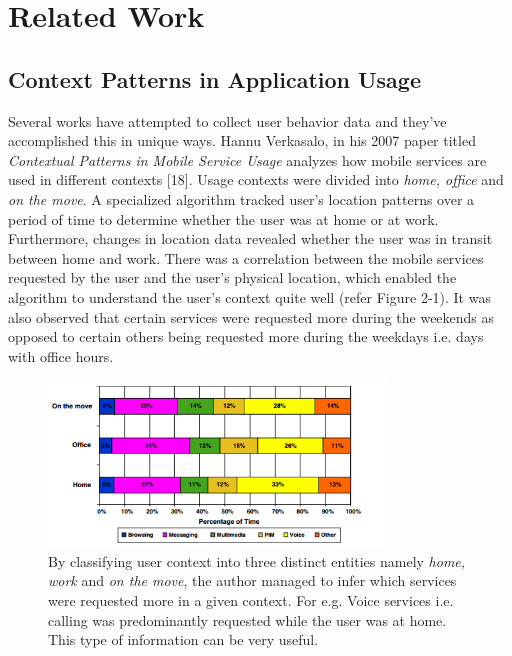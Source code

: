 \documentclass[12pt]{uthesis-v12}  %
\begin{document}

\chapter{Related Work}
	
	\section{Context Patterns in Application Usage}
		Several works have attempted to collect user behavior data and they've accomplished this in unique ways. Hannu Verkasalo, in his 2007 paper titled {\em Contextual Patterns in Mobile Service Usage} analyzes how mobile services are used in different contexts [18]. Usage contexts were divided into {\em home, office} and {\em on the move}. A specialized algorithm tracked user's location patterns over a period of time to determine whether the user was at home or at work. Furthermore, changes in location data revealed whether the user was in transit between home and work. There was a correlation between the mobile services requested by the user and the user's physical location, which enabled the algorithm to understand the user's context quite well (refer Figure 2-1). It was also observed that certain services were requested more during the weekends as opposed to certain others being requested more during the weekdays i.e. days with office hours.  
		
		\begin{figure}[!ht]
			\centering
			\includegraphics[width = 90mm]{images/appsByTime.png}
			\caption[Mobile Services Requested At Various Times Of Day]
			{By classifying user context into three distinct entities namely {\em home, work} and {\em on the move}, the author managed to infer which services were requested more in a given context. For e.g. Voice services i.e. calling was predominantly requested while the user was at home. This type of information can be very useful.}
		\end{figure}
	
\end{document}
